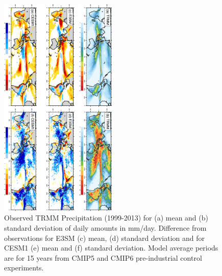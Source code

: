 \documentclass[draft,ms]{AGUTeX}
\begin{document}
\begin{article}
\begin{figure}
  \begin{center}
    \noindent\includegraphics[width=0.5\textwidth,angle=90.]{./figs/f_mean_var_PRECT_DJF.pdf}
  \end{center}
  \caption{Observed TRMM Precipitation (1999-2013) for (a) mean and (b) standard deviation of daily amounts in mm/day. Difference from observations for E3SM (c) mean, (d) standard deviation and for CESM1 (e) mean and (f) standard deviation. Model average periods are for 15 years from CMIP5 and CMIP6 pre-industrial control experiments.} 
\label{f_mean_var_PRECT_DJF}
\end{figure}



\end{article}
\end{document}

